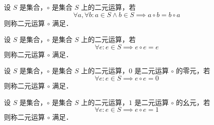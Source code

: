 \begin{Definition}\label{Definition:Commutative}
    设 $S$ 是集合，$\circ$ 是集合 $S$ 上的二元运算，若
    \[ \forall a, \forall b : a \in S \land b \in S \implies a \circ b = b \circ a \]
    则称二元运算 $\circ$ 满足．
\end{Definition}

\begin{Definition}\label{Definition:Idempotent}
    设 $S$ 是集合，$\circ$ 是集合 $S$ 上的二元运算，若
    \[ \forall e : e \in S \implies e \circ e = e \]
    则称二元运算 $\circ$ 满足．
\end{Definition}

\begin{Definition}\label{Definition:Nilpotent}
    设 $S$ 是集合，$\circ$ 是集合 $S$ 上的二元运算，$0$ 是二元运算 $\circ$ 的零元，若
    \[ \forall e : e \in S \implies e \circ e = 0 \]
    则称二元运算 $\circ$ 满足．
\end{Definition}

\begin{Definition}\label{Definition:Unipotent}
    设 $S$ 是集合，$\circ$ 是集合 $S$ 上的二元运算，$1$ 是二元运算 $\circ$ 的幺元，若
    \[ \forall e : e \in S \implies e \circ e = 1 \]
    则称二元运算 $\circ$ 满足．
\end{Definition}
